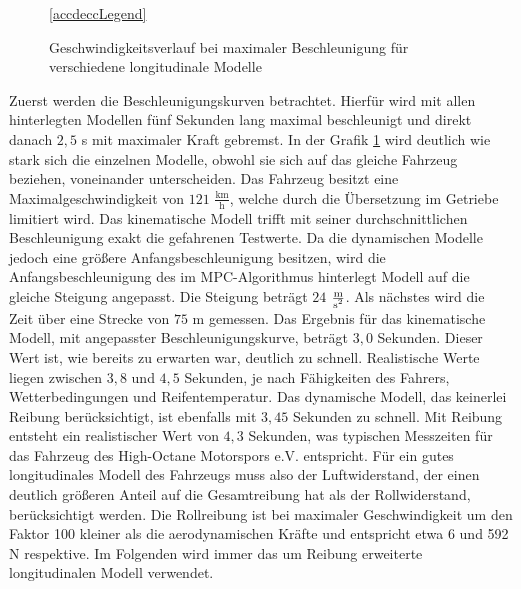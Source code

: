 \documentclass{like}
\begin{document}
\begin{figure}
	\centering
	 
	\ref{accdeccLegend}
	\caption{Geschwindigkeitsverlauf bei maximaler Beschleunigung für verschiedene longitudinale Modelle}
	\label{fig:accdec}
\end{figure}
Zuerst werden die Beschleunigungskurven betrachtet. Hierfür wird mit allen hinterlegten Modellen fünf Sekunden lang maximal beschleunigt und direkt danach $2,5$ s mit maximaler Kraft gebremst.
In der Grafik \ref{fig:accdec} wird deutlich wie stark sich die einzelnen Modelle, obwohl sie sich auf das gleiche Fahrzeug beziehen, voneinander unterscheiden. Das Fahrzeug besitzt eine Maximalgeschwindigkeit von $121$  $\frac{\text{km}}{\text{h}}$, welche durch die Übersetzung im Getriebe limitiert wird. Das kinematische Modell trifft mit seiner durchschnittlichen Beschleunigung exakt die gefahrenen Testwerte. Da die dynamischen Modelle jedoch eine größere Anfangsbeschleunigung besitzen, wird die Anfangsbeschleunigung des im \ac{MPC}-Algorithmus hinterlegt Modell auf die gleiche Steigung angepasst. Die Steigung beträgt $24$ $ \frac{\text{m}}{\text{s\textsuperscript{2}}}$. 
Als nächstes wird die Zeit über eine Strecke von $75$ m gemessen. Das Ergebnis für das kinematische Modell, mit angepasster Beschleunigungskurve, beträgt $3,0$ Sekunden. Dieser Wert ist, wie bereits zu erwarten war, deutlich zu schnell. Realistische Werte liegen zwischen $3,8$ und $4,5$ Sekunden, je nach Fähigkeiten des Fahrers, Wetterbedingungen und Reifentemperatur. Das dynamische Modell, das keinerlei Reibung berücksichtigt, ist ebenfalls mit $3,45$ Sekunden zu schnell. Mit Reibung entsteht ein realistischer Wert von $4,3$ Sekunden, was typischen Messzeiten für das Fahrzeug des High-Octane Motorspors e.V. entspricht. Für ein gutes longitudinales Modell des Fahrzeugs muss also der Luftwiderstand, der einen deutlich größeren Anteil auf die Gesamtreibung hat als der Rollwiderstand, berücksichtigt werden. Die Rollreibung ist bei maximaler Geschwindigkeit um den Faktor 100 kleiner als die aerodynamischen Kräfte und entspricht etwa 6 und 592 N respektive. Im Folgenden wird immer das um Reibung erweiterte longitudinalen Modell verwendet.
\end{document}
